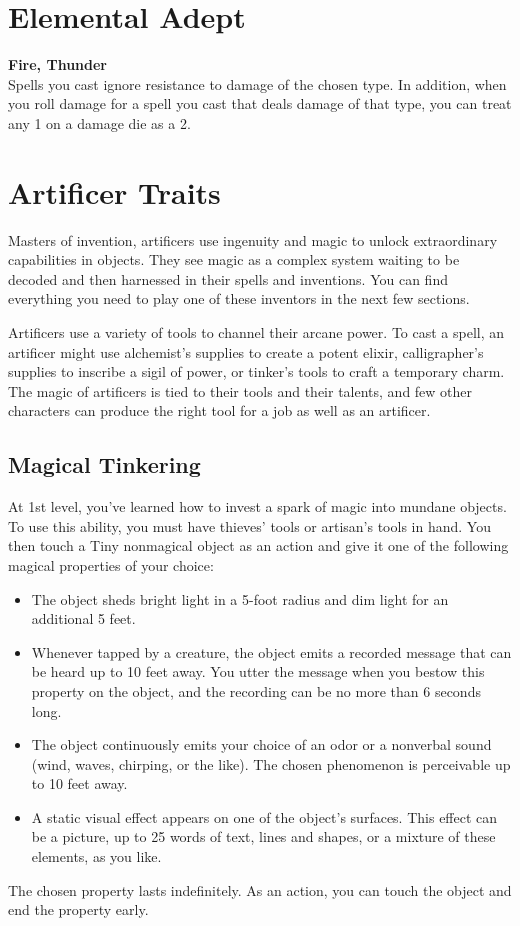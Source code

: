 {\section*{Elemental Adept}
\textbf{Fire, Thunder}\\
Spells you cast ignore resistance to damage of the chosen type. In addition, when you roll damage for a spell you cast that deals damage of that type, you can treat any 1 on a damage die as a 2.

\section*{Artificer Traits}
Masters of invention, artificers use ingenuity and magic to unlock extraordinary capabilities in objects. They see magic as a complex system waiting to be decoded and then harnessed in their spells and inventions. You can find everything you need to play one of these inventors in the next few sections.

Artificers use a variety of tools to channel their arcane power. To cast a spell, an artificer might use alchemist's supplies to create a potent elixir, calligrapher's supplies to inscribe a sigil of power, or tinker's tools to craft a temporary charm. The magic of artificers is tied to their tools and their talents, and few other characters can produce the right tool for a job as well as an artificer.
\subsection*{Magical Tinkering}
At 1st level, you've learned how to invest a spark of magic into mundane objects. To use this ability, you must have thieves' tools or artisan's tools in hand. You then touch a Tiny nonmagical object as an action and give it one of the following magical properties of your choice:
\begin{itemize}
	\item The object sheds bright light in a 5-foot radius and dim light for an additional 5 feet.
	\item Whenever tapped by a creature, the object emits a recorded message that can be heard up to 10 feet away. You utter the message when you bestow this property on the object, and the recording can be no more than 6 seconds long.
	\item The object continuously emits your choice of an odor or a nonverbal sound (wind, waves, chirping, or the like). The chosen phenomenon is perceivable up to 10 feet away.
	\item A static visual effect appears on one of the object's surfaces. This effect can be a picture, up to 25 words of text, lines and shapes, or a mixture of these elements, as you like.
\end{itemize}
The chosen property lasts indefinitely. As an action, you can touch the object and end the property early.

}
